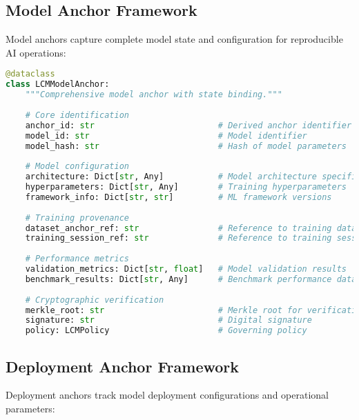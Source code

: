 \documentclass[12pt,a4paper]{article}
\begin{document}
\subsection{Model Anchor Framework}

Model anchors capture complete model state and configuration for reproducible AI operations:

\begin{lstlisting}[language=Python, caption=Model Anchor Structure]
@dataclass
class LCMModelAnchor:
    """Comprehensive model anchor with state binding."""
    
    # Core identification
    anchor_id: str                         # Derived anchor identifier
    model_id: str                          # Model identifier
    model_hash: str                        # Hash of model parameters
    
    # Model configuration
    architecture: Dict[str, Any]           # Model architecture specification
    hyperparameters: Dict[str, Any]        # Training hyperparameters
    framework_info: Dict[str, str]         # ML framework versions
    
    # Training provenance
    dataset_anchor_ref: str                # Reference to training dataset anchor
    training_session_ref: str              # Reference to training session
    
    # Performance metrics
    validation_metrics: Dict[str, float]   # Model validation results
    benchmark_results: Dict[str, Any]      # Benchmark performance data
    
    # Cryptographic verification
    merkle_root: str                       # Merkle root for verification
    signature: str                         # Digital signature
    policy: LCMPolicy                      # Governing policy
\end{lstlisting}

\subsection{Deployment Anchor Framework}

Deployment anchors track model deployment configurations and operational parameters:
\end{document}

